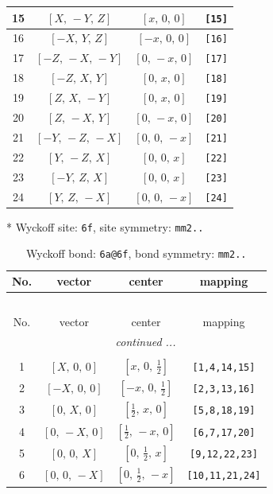 \documentclass[fleqn,8pt]{jsarticle}
\begin{document}
\begin{longtable}{cccc}
15 & $\left[ X,\, - Y,\, Z \right]$ & $\left[ x,\, 0,\, 0 \right]$ & {\tt [15]} \\ \hline
16 & $\left[ - X,\, Y,\, Z \right]$ & $\left[ - x,\, 0,\, 0 \right]$ & {\tt [16]} \\ \hline
17 & $\left[ - Z,\, - X,\, - Y \right]$ & $\left[ 0,\, - x,\, 0 \right]$ & {\tt [17]} \\ \hline
18 & $\left[ - Z,\, X,\, Y \right]$ & $\left[ 0,\, x,\, 0 \right]$ & {\tt [18]} \\ \hline
19 & $\left[ Z,\, X,\, - Y \right]$ & $\left[ 0,\, x,\, 0 \right]$ & {\tt [19]} \\ \hline
20 & $\left[ Z,\, - X,\, Y \right]$ & $\left[ 0,\, - x,\, 0 \right]$ & {\tt [20]} \\ \hline
21 & $\left[ - Y,\, - Z,\, - X \right]$ & $\left[ 0,\, 0,\, - x \right]$ & {\tt [21]} \\ \hline
22 & $\left[ Y,\, - Z,\, X \right]$ & $\left[ 0,\, 0,\, x \right]$ & {\tt [22]} \\ \hline
23 & $\left[ - Y,\, Z,\, X \right]$ & $\left[ 0,\, 0,\, x \right]$ & {\tt [23]} \\ \hline
24 & $\left[ Y,\, Z,\, - X \right]$ & $\left[ 0,\, 0,\, - x \right]$ & {\tt [24]} \\
\end{longtable}
* Wyckoff site: {\tt 6f}, site symmetry: {\tt mm2..}
\renewcommand{\arraystretch}{1.2}
\begin{longtable}{cccc}
\caption{Wyckoff bond: {\tt 6a@6f}, bond symmetry: {\tt mm2..}}
 \\
 \hline \hline
No. & vector & center & mapping \\ \hline \endfirsthead

\multicolumn{3}{l}{\tablename\ \thetable{}} \\
 \hline \hline
No. & vector & center & mapping \\ \hline \endhead

 \hline \hline
\multicolumn{3}{r}{\footnotesize\it continued ...} \\ \endfoot

 \hline \hline
\multicolumn{3}{r}{} \\ \endlastfoot

1 & $\left[ X,\, 0,\, 0 \right]$ & $\left[ x,\, 0,\, \frac{1}{2} \right]$ & {\tt [1,4,14,15]} \\ \hline
2 & $\left[ - X,\, 0,\, 0 \right]$ & $\left[ - x,\, 0,\, \frac{1}{2} \right]$ & {\tt [2,3,13,16]} \\ \hline
3 & $\left[ 0,\, X,\, 0 \right]$ & $\left[ \frac{1}{2},\, x,\, 0 \right]$ & {\tt [5,8,18,19]} \\ \hline
4 & $\left[ 0,\, - X,\, 0 \right]$ & $\left[ \frac{1}{2},\, - x,\, 0 \right]$ & {\tt [6,7,17,20]} \\ \hline
5 & $\left[ 0,\, 0,\, X \right]$ & $\left[ 0,\, \frac{1}{2},\, x \right]$ & {\tt [9,12,22,23]} \\ \hline
6 & $\left[ 0,\, 0,\, - X \right]$ & $\left[ 0,\, \frac{1}{2},\, - x \right]$ & {\tt [10,11,21,24]} \\
\end{longtable}
\end{document}
